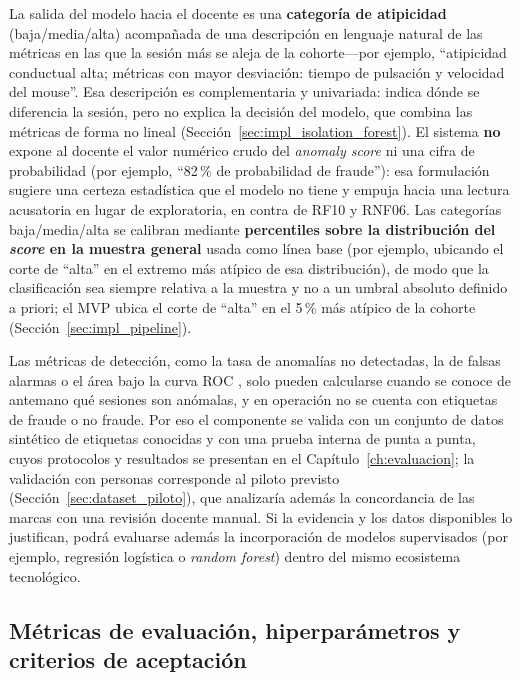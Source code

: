 La salida del modelo hacia el docente es una \textbf{categoría de atipicidad} (baja/media/alta) acompañada de una descripción en lenguaje natural de las métricas en las que la sesión más se aleja de la cohorte---por ejemplo, ``atipicidad conductual alta; métricas con mayor desviación: tiempo de pulsación y velocidad del mouse''. Esa descripción es complementaria y univariada: indica dónde se diferencia la sesión, pero no explica la decisión del modelo, que combina las métricas de forma no lineal (Sección~\ref{sec:impl_isolation_forest}). El sistema \textbf{no} expone al docente el valor numérico crudo del \textit{anomaly score} ni una cifra de probabilidad (por ejemplo, ``82\,\% de probabilidad de fraude''): esa formulación sugiere una certeza estadística que el modelo no tiene y empuja hacia una lectura acusatoria en lugar de exploratoria, en contra de RF10 y RNF06. Las categorías baja/media/alta se calibran mediante \textbf{percentiles sobre la distribución del \textit{score} en la muestra general} usada como línea base (por ejemplo, ubicando el corte de ``alta'' en el extremo más atípico de esa distribución), de modo que la clasificación sea siempre relativa a la muestra y no a un umbral absoluto definido a priori; el MVP ubica el corte de ``alta'' en el 5\,\% más atípico de la cohorte (Sección~\ref{sec:impl_pipeline}).

Las métricas de detección, como la tasa de anomalías no detectadas, la de falsas alarmas o el área bajo la curva ROC \parencite{Fawcett2006, Jain2004}, solo pueden calcularse cuando se conoce de antemano qué sesiones son anómalas, y en operación no se cuenta con etiquetas de fraude o no fraude. Por eso el componente se valida con un conjunto de datos sintético de etiquetas conocidas y con una prueba interna de punta a punta, cuyos protocolos y resultados se presentan en el Capítulo~\ref{ch:evaluacion}; la validación con personas corresponde al piloto previsto (Sección~\ref{sec:dataset_piloto}), que analizaría además la concordancia de las marcas con una revisión docente manual. Si la evidencia y los datos disponibles lo justifican, podrá evaluarse además la incorporación de modelos supervisados (por ejemplo, regresión logística o \textit{random forest}) dentro del mismo ecosistema tecnológico.

\subsection{Métricas de evaluación, hiperparámetros y criterios de aceptación}
\label{sec:metricas_eval_ia}

